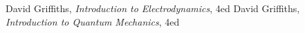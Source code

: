 
\begin{thebibliography}{99}
David Griffiths, \textsl{Introduction to Electrodynamics}, 4ed
David Griffiths, \textsl{Introduction to Quantum Mechanics}, 4ed
\end{thebibliography}
